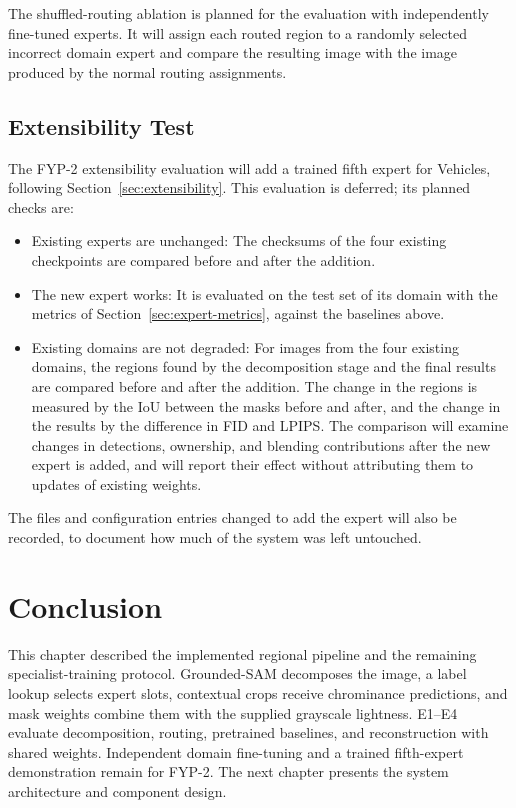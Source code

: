 \documentclass{FastFyp}
\begin{document}
The shuffled-routing ablation is planned for the evaluation with
independently fine-tuned experts. It will assign each routed region to
a randomly selected incorrect domain expert and compare the resulting
image with the image produced by the normal routing assignments.

\subsection{Extensibility Test}

The FYP-2 extensibility evaluation will add a trained fifth expert for Vehicles, following Section~\ref{sec:extensibility}. This evaluation is deferred; its planned checks are:

\begin{itemize}
    \item Existing experts are unchanged: The checksums of the four existing checkpoints are compared before and after the addition.
    \item The new expert works: It is evaluated on the test set of its domain with the metrics of Section~\ref{sec:expert-metrics}, against the baselines above.
    \item Existing domains are not degraded: For images from the four existing domains, the regions found by the decomposition stage and the final results are compared before and after the addition. The change in the regions is measured by the IoU between the masks before and after, and the change in the results by the difference in FID and LPIPS. The comparison will examine changes in detections, ownership, and blending contributions after the new expert is added, and will report their effect without attributing them to updates of existing weights.
\end{itemize}

The files and configuration entries changed to add the expert will also be recorded, to document how much of the system was left untouched.

\section{Conclusion}

This chapter described the implemented regional pipeline and the remaining specialist-training protocol. Grounded-SAM decomposes the image, a label lookup selects expert slots, contextual crops receive chrominance predictions, and mask weights combine them with the supplied grayscale lightness. E1--E4 evaluate decomposition, routing, pretrained baselines, and reconstruction with shared weights. Independent domain fine-tuning and a trained fifth-expert demonstration remain for FYP-2. The next chapter presents the system architecture and component design.
\end{document}
